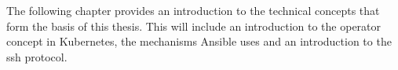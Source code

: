 The following chapter provides an introduction to the technical concepts that form the basis of this thesis.
This will include an introduction to the operator concept in Kubernetes, the mechanisms Ansible uses and an introduction to the \gls{ssh} protocol.
